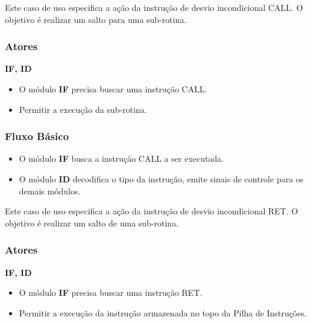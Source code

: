 
Este caso de uso especifica a ação da instrução de desvio incondicional CALL. O objetivo é realizar um salto para uma sub-rotina.

\subsubsection*{Atores}
\textbf{IF, ID}

\preconditions 
\begin{itemize}
	\item O módulo \textbf{IF} precisa buscar uma instrução CALL.
\end{itemize}

\postconditions
\begin{itemize}
	\item Permitir a execução da sub-rotina.
\end{itemize}

\subsubsection*{Fluxo Básico}
\begin{itemize}
	\item O módulo \textbf{IF} busca a instrução CALL a ser executada.
	\item O módulo \textbf{ID} decodifica o tipo da instrução, emite sinais de controle para os demais módulos.
\end{itemize}


Este caso de uso especifica a ação da instrução de desvio incondicional RET. O objetivo é realizar um salto de uma sub-rotina.

\subsubsection*{Atores}
\textbf{IF, ID}

\preconditions 
\begin{itemize}
	\item O módulo \textbf{IF} precisa buscar uma instrução RET.
\end{itemize}

\postconditions
\begin{itemize}
	\item Permitir a execução da instrução armazenada no topo da Pilha de Instruções.
\end{itemize}


